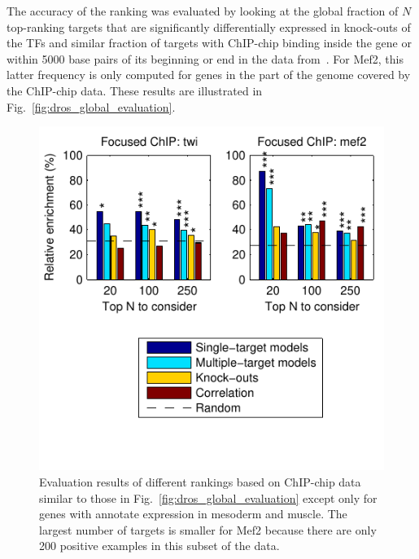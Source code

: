 \documentclass{pnastwo}
\begin{document}
\begin{article}
The accuracy of the ranking was evaluated by looking at the global
fraction of $N$ top-ranking targets that are significantly
differentially expressed in knock-outs of the TFs and similar fraction
of targets with ChIP-chip binding inside the gene or within 5000 base
pairs of its beginning or end in the data
from~\cite{Sandmann2006a,Sandmann2007a}.  For Mef2, this latter
frequency is only computed for genes in the part of the genome covered
by the ChIP-chip data.  These results are illustrated in
Fig.~\ref{fig:dros_global_evaluation}.

\begin{figure}[tb]
  \centering
  \includegraphics[trim=0mm 10mm 0mm 0mm]{dros_focused_evaluation}
  \caption{Evaluation results of different rankings based on
    ChIP-chip data similar to those in
    Fig.~\ref{fig:dros_global_evaluation} except only for genes
    with annotate expression in mesoderm and muscle.
    The largest number of targets is smaller for Mef2
    because there are only 200 positive examples in this subset of the
    data.}
  \label{fig:dros_focused_evaluation}
\end{figure}


\end{article}
\end{document}
